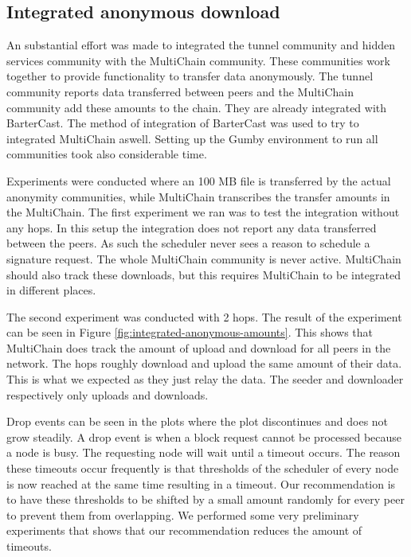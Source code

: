 \subsection{Integrated anonymous download}
An substantial effort was made to integrated the tunnel community and hidden services community with the MultiChain community.
These communities work together to provide functionality to transfer data anonymously.
The tunnel community reports data transferred between peers and the MultiChain community add these amounts to the chain.
They are already integrated with BarterCast.
The method of integration of BarterCast was used to try to integrated MultiChain aswell.
Setting up the Gumby environment to run all communities took also considerable time.

Experiments were conducted where an 100 MB file is transferred by the actual anonymity communities,
while MultiChain transcribes the transfer amounts in the MultiChain.
The first experiment we ran was to test the integration without any hops.
In this setup the integration does not report any data transferred between the peers.
As such the scheduler never sees a reason to schedule a signature request.
The whole MultiChain community is never active.
MultiChain should also track these downloads,
but this requires MultiChain to be integrated in different places.

The second experiment was conducted with 2 hops.
The result of the experiment can be seen in Figure \ref{fig:integrated-anonymous-amounts}.
This shows that MultiChain does track the amount of upload and download for all peers in the network.
The hops roughly download and upload the same amount of their data.
This is what we expected as they just relay the data.
The seeder and downloader respectively only uploads and downloads.

Drop events can be seen in the plots where the plot discontinues and does not grow steadily.
A drop event is when a block request cannot be processed because a node is busy.
The requesting node will wait until a timeout occurs.
The reason these timeouts occur frequently is that thresholds of the scheduler of every node is now reached at the same time resulting in a timeout.
Our recommendation is to have these thresholds to be shifted by a small amount randomly for every peer
to prevent them from overlapping.
We performed some very preliminary experiments that shows that our recommendation reduces the amount of timeouts.

